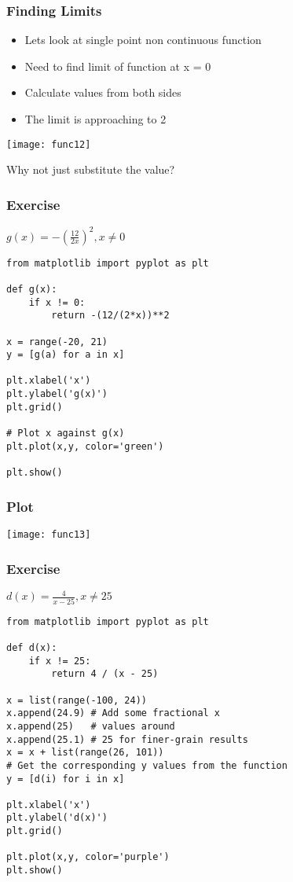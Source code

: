  \begin{frame}[fragile]\frametitle{Finding Limits}
\begin{itemize}
\item Lets look at single point non continuous function
\item Need to find limit of function at x = 0
\item Calculate values from both sides
\item The limit is approaching to 2
\end{itemize}
\begin{center}
\texttt{[image: func12]}
\end{center}
Why not just substitute the value?
\end{frame}



 \begin{frame}[fragile]\frametitle{Exercise}
$g(x) = -(\frac{12}{2x})^2, x \neq 0$

\begin{lstlisting}
from matplotlib import pyplot as plt

def g(x):
    if x != 0:
        return -(12/(2*x))**2
    
x = range(-20, 21)
y = [g(a) for a in x]

plt.xlabel('x')
plt.ylabel('g(x)')
plt.grid()

# Plot x against g(x)
plt.plot(x,y, color='green')

plt.show()
\end{lstlisting}
\end{frame}

 \begin{frame}[fragile]\frametitle{Plot}
\begin{center}
\texttt{[image: func13]}
\end{center}

\end{frame}


 \begin{frame}[fragile]\frametitle{Exercise}
$d(x) = \frac{4}{x-25}, x \neq 25$

\begin{lstlisting}
from matplotlib import pyplot as plt

def d(x):
    if x != 25:
        return 4 / (x - 25)

x = list(range(-100, 24))
x.append(24.9) # Add some fractional x
x.append(25)   # values around
x.append(25.1) # 25 for finer-grain results
x = x + list(range(26, 101))
# Get the corresponding y values from the function
y = [d(i) for i in x]

plt.xlabel('x')
plt.ylabel('d(x)')
plt.grid()

plt.plot(x,y, color='purple')
plt.show()
\end{lstlisting}
\end{frame}

